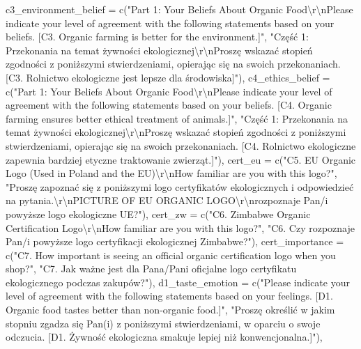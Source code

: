\documentclass[
  letterpaper,
  DIV=11,
  numbers=noendperiod]{scrartcl}
\newenvironment{Shaded}{\begin{snugshade}}{\end{snugshade}}
\newcommand{\AttributeTok}[1]{\textcolor[rgb]{0.40,0.45,0.13}{#1}}
\newcommand{\FunctionTok}[1]{\textcolor[rgb]{0.28,0.35,0.67}{#1}}
\newcommand{\NormalTok}[1]{\textcolor[rgb]{0.00,0.23,0.31}{#1}}
\newcommand{\SpecialCharTok}[1]{\textcolor[rgb]{0.37,0.37,0.37}{#1}}
\newcommand{\StringTok}[1]{\textcolor[rgb]{0.13,0.47,0.30}{#1}}
\begin{document}
\begin{Shaded}
\begin{Highlighting}[]
  \AttributeTok{c3\_environment\_belief =} \FunctionTok{c}\NormalTok{(}\StringTok{"Part 1: Your Beliefs About Organic Food}\SpecialCharTok{\textbackslash{}r\textbackslash{}n}\StringTok{Please indicate your level of agreement with the following statements based on your beliefs. [C3. Organic farming is better for the environment.]"}\NormalTok{, }\StringTok{"Część 1: Przekonania na temat żywności ekologicznej}\SpecialCharTok{\textbackslash{}r\textbackslash{}n}\StringTok{Proszę wskazać stopień zgodności z poniższymi stwierdzeniami, opierając się na swoich przekonaniach. [C3. Rolnictwo ekologiczne jest lepsze dla środowiska]"}\NormalTok{),}
  \AttributeTok{c4\_ethics\_belief =} \FunctionTok{c}\NormalTok{(}\StringTok{"Part 1: Your Beliefs About Organic Food}\SpecialCharTok{\textbackslash{}r\textbackslash{}n}\StringTok{Please indicate your level of agreement with the following statements based on your beliefs. [C4. Organic farming ensures better ethical treatment of animals.]"}\NormalTok{,}
\StringTok{"Część 1: Przekonania na temat żywności ekologicznej}\SpecialCharTok{\textbackslash{}r\textbackslash{}n}\StringTok{Proszę wskazać stopień zgodności z poniższymi stwierdzeniami, opierając się na swoich przekonaniach. [C4. Rolnictwo ekologiczne zapewnia bardziej etyczne traktowanie zwierząt.]"}\NormalTok{),}
\AttributeTok{cert\_eu =} \FunctionTok{c}\NormalTok{(}\StringTok{"C5. EU Organic Logo (Used in Poland and the EU)}\SpecialCharTok{\textbackslash{}r\textbackslash{}n}\StringTok{How familiar are you with this logo?"}\NormalTok{, }\StringTok{"Proszę zapoznać się z poniższymi logo certyfikatów ekologicznych i odpowiedzieć na pytania.}\SpecialCharTok{\textbackslash{}r\textbackslash{}n}\StringTok{PICTURE OF EU ORGANIC LOGO}\SpecialCharTok{\textbackslash{}r\textbackslash{}n}\StringTok{rozpoznaje Pan/i powyższe logo ekologiczne UE?"}\NormalTok{),}
\AttributeTok{cert\_zw =} \FunctionTok{c}\NormalTok{(}\StringTok{"C6. Zimbabwe Organic Certification Logo}\SpecialCharTok{\textbackslash{}r\textbackslash{}n}\StringTok{How familiar are you with this logo?"}\NormalTok{, }\StringTok{"C6. Czy rozpoznaje Pan/i powyższe logo certyfikacji ekologicznej Zimbabwe?"}\NormalTok{),}
\AttributeTok{cert\_importance =} \FunctionTok{c}\NormalTok{(}\StringTok{"C7. How important is seeing an official organic certification logo when you shop?"}\NormalTok{, }\StringTok{"C7. Jak ważne jest dla Pana/Pani oficjalne logo certyfikatu ekologicznego podczas zakupów?"}\NormalTok{),}
\AttributeTok{d1\_taste\_emotion =} \FunctionTok{c}\NormalTok{(}\StringTok{"Please indicate your level of agreement with the following statements based on your feelings. [D1. Organic food tastes better than non{-}organic food.]"}\NormalTok{, }\StringTok{"Proszę określić w jakim stopniu zgadza się Pan(i) z poniższymi stwierdzeniami, w oparciu o swoje odczucia. [D1. Żywność ekologiczna smakuje lepiej niż konwencjonalna.]"}\NormalTok{),}

\end{Highlighting}
\end{Shaded}
\end{document}
